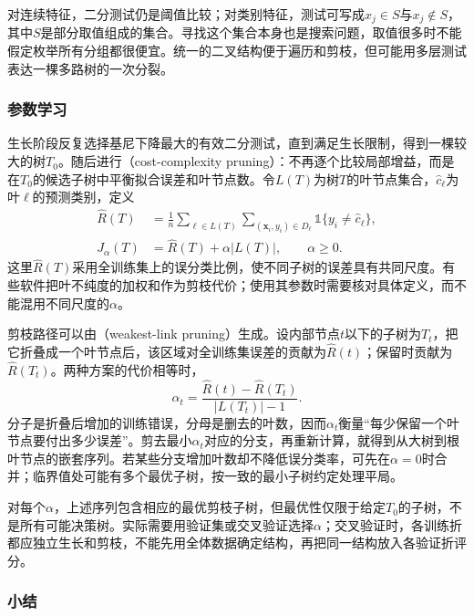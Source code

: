 对连续特征，二分测试仍是阈值比较；对类别特征，测试可写成$x_j\in S$与$x_j\notin S$，其中$S$是部分取值组成的集合。寻找这个集合本身也是搜索问题，取值很多时不能假定枚举所有分组都很便宜。统一的二叉结构便于遍历和剪枝，但可能用多层测试表达一棵多路树的一次分裂。

\subsubsection{参数学习}
\label{sec:classification-cart-learning}

生长阶段反复选择基尼下降最大的有效二分测试，直到满足生长限制，得到一棵较大的树$T_0$。随后进行（cost-complexity pruning）：不再逐个比较局部增益，而是在$T_0$的候选子树中平衡拟合误差和叶节点数。令$L(T)$为树$T$的叶节点集合，$\hat c_\ell$为叶$\ell$的预测类别，定义
\begin{align}
  \widehat R(T)
  &=\frac{1}{n}\sum_{\ell\in L(T)}
    \sum_{(\bm{x}_i,y_i)\in D_\ell}
    \mathbb{1}\{y_i\neq\hat c_\ell\},
  \label{eq:classification-cart-empirical-risk}\\
  J_\alpha(T)&=\widehat R(T)+\alpha|L(T)|,
  \qquad \alpha\geq0.
  \label{eq:classification-cart-cost-complexity}
\end{align}
这里$\widehat R(T)$采用全训练集上的误分类比例，使不同子树的误差具有共同尺度。有些软件把叶不纯度的加权和作为剪枝代价；使用其参数时需要核对具体定义，而不能混用不同尺度的$\alpha$。

剪枝路径可以由（weakest-link pruning）生成。设内部节点$t$以下的子树为$T_t$，把它折叠成一个叶节点后，该区域对全训练集误差的贡献为$\widehat R(t)$；保留时贡献为$\widehat R(T_t)$。两种方案的代价相等时，
\begin{equation}
  \alpha_t=
  \frac{\widehat R(t)-\widehat R(T_t)}
       {|L(T_t)|-1}.
  \label{eq:classification-weakest-link}
\end{equation}
分子是折叠后增加的训练错误，分母是删去的叶数，因而$\alpha_t$衡量“每少保留一个叶节点要付出多少误差”。剪去最小$\alpha_t$对应的分支，再重新计算，就得到从大树到根叶节点的嵌套序列。若某些分支增加叶数却不降低误分类率，可先在$\alpha=0$时合并；临界值处可能有多个最优子树，按一致的最小子树约定处理平局。

对每个$\alpha$，上述序列包含相应的最优剪枝子树，但最优性仅限于给定$T_0$的子树，不是所有可能决策树。实际需要用验证集或交叉验证选择$\alpha$；交叉验证时，各训练折都应独立生长和剪枝，不能先用全体数据确定结构，再把同一结构放入各验证折评分。

\subsubsection{小结}
\label{sec:classification-cart-summary}

